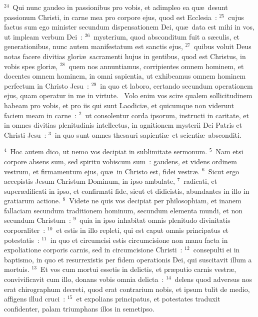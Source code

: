 ${}^{24}$~Qui nunc gaudeo in passionibus pro vobis, et adimpleo ea qu\ae\ desunt passionum Christi, in carne mea pro corpore ejus, quod est Ecclesia~:
${}^{25}$~cujus factus sum ego minister secundum dispensationem Dei, qu\ae\ data est mihi in vos, ut impleam verbum Dei~:
${}^{26}$~mysterium, quod absconditum fuit a s\ae culis, et generationibus, nunc autem manifestatum est sanctis ejus,
${}^{27}$~quibus voluit Deus notas facere divitias glori\ae\ sacramenti hujus in gentibus, quod est Christus, in vobis spes glori\ae ,
${}^{28}$~quem nos annuntiamus, corripientes omnem hominem, et docentes omnem hominem, in omni sapientia, ut exhibeamus omnem hominem perfectum in Christo Jesu~:
${}^{29}$~in quo et laboro, certando secundum operationem ejus, quam operatur in me in virtute.
~Volo enim vos scire qualem sollicitudinem habeam pro vobis, et pro iis qui sunt Laodici\ae , et quicumque non viderunt faciem meam in carne~:
${}^{2}$~ut consolentur corda ipsorum, instructi in caritate, et in omnes divitias plenitudinis intellectus, in agnitionem mysterii Dei Patris et Christi Jesu~:
${}^{3}$~in quo sunt omnes thesauri sapienti\ae\ et scienti\ae\ absconditi.


${}^{4}$~Hoc autem dico, ut nemo vos decipiat in sublimitate sermonum.
${}^{5}$~Nam etsi corpore absens sum, sed spiritu vobiscum sum~: gaudens, et videns ordinem vestrum, et firmamentum ejus, qu\ae\ in Christo est, fidei vestr\ae .
${}^{6}$~Sicut ergo accepistis Jesum Christum Dominum, in ipso ambulate,
${}^{7}$~radicati, et super\ae dificati in ipso, et confirmati fide, sicut et didicistis, abundantes in illo in gratiarum actione.
${}^{8}$~Videte ne quis vos decipiat per philosophiam, et inanem fallaciam secundum traditionem hominum, secundum elementa mundi, et non secundum Christum~:
${}^{9}$~quia in ipso inhabitat omnis plenitudo divinitatis corporaliter~:
${}^{10}$~et estis in illo repleti, qui est caput omnis principatus et potestatis~:
${}^{11}$~in quo et circumcisi estis circumcisione non manu facta in expoliatione corporis carnis, sed in circumcisione Christi~:
${}^{12}$~consepulti ei in baptismo, in quo et resurrexistis per fidem operationis Dei, qui suscitavit illum a mortuis.
${}^{13}$~Et vos cum mortui essetis in delictis, et pr\ae putio carnis vestr\ae , convivificavit cum illo, donans vobis omnia delicta~:
${}^{14}$~delens quod adversus nos erat chirographum decreti, quod erat contrarium nobis, et ipsum tulit de medio, affigens illud cruci~:
${}^{15}$~et expolians principatus, et potestates traduxit confidenter, palam triumphans illos in semetipso.


